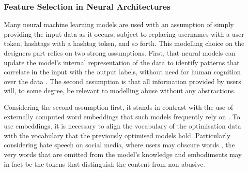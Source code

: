 \subsubsection{Feature Selection in Neural Architectures}
Many neural machine learning models are used with an assumption of simply providing the input data as it occurs, subject to replacing usernames with a user token, hashtags with a hashtag token, and so forth.
This modelling choice on the designers part relies on two strong assumptions. 
First, that neural models can  update the model's internal representation of the data  to identify patterns that correlate in the input  with the output labels, without  need for human cognition  over the data .
The second assumption is that all information provided by users will, to some degree, be relevant to modelling abuse without any abstractions.

Considering the second assumption first, it stands in contrast with the use of externally computed word embeddings that such models frequently rely on \citep{Kshirsagar:2018,Isaksen:2020}.
To use  embeddings, it is necessary to align the vocabulary of the optimisation data with the vocabulary that the previously optimised models hold.
Particularly considering hate speech on social media, where users may  obscure words  \citep{Rottger:2021}, the very words that are omitted from the model's knowledge and embodiments may in fact be the tokens that distinguish the  content from non-abusive.

